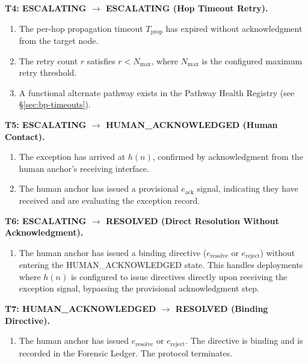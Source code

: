\bigskip
\noindent\textbf{T4: ESCALATING $\rightarrow$ ESCALATING (Hop Timeout Retry).}

\begin{enumerate}
    \item[(T4-C1)] The per-hop propagation timeout $T_{\text{prop}}$ has expired without acknowledgment from the target node.
    \item[(T4-C2)] The retry count $r$ satisfies $r < N_{\max}$, where $N_{\max}$ is the configured maximum retry threshold.
    \item[(T4-C3)] A functional alternate pathway exists in the Pathway Health Registry (see \S\ref{sec:bp-timeouts}).
\end{enumerate}

\bigskip
\noindent\textbf{T5: ESCALATING $\rightarrow$ HUMAN\_ACKNOWLEDGED (Human Contact).}

\begin{enumerate}
    \item[(T5-C1)] The exception has arrived at $h(n)$, confirmed by acknowledgment from the human anchor's receiving interface.
    \item[(T5-C2)] The human anchor has issued a provisional $e_{\text{ack}}$ signal, indicating they have received and are evaluating the exception record.
\end{enumerate}

\bigskip
\noindent\textbf{T6: ESCALATING $\rightarrow$ RESOLVED (Direct Resolution Without Acknowledgment).}

\begin{enumerate}
    \item[(T6-C1)] The human anchor has issued a binding directive ($e_{\text{resolve}}$ or $e_{\text{reject}}$) without entering the HUMAN\_ACKNOWLEDGED state. This handles deployments where $h(n)$ is configured to issue directives directly upon receiving the exception signal, bypassing the provisional acknowledgment step.
\end{enumerate}

\bigskip
\noindent\textbf{T7: HUMAN\_ACKNOWLEDGED $\rightarrow$ RESOLVED (Binding Directive).}

\begin{enumerate}
    \item[(T7-C1)] The human anchor has issued $e_{\text{resolve}}$ or $e_{\text{reject}}$. The directive is binding and is recorded in the Forensic Ledger. The protocol terminates.
\end{enumerate}

